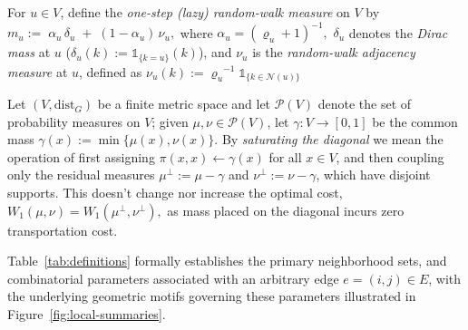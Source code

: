 \documentclass[twoside,11pt]{article}
\numberwithin{equation}{section}
\numberwithin{theorem}{section}
\numberwithin{example}{section}
\begin{document}
\begin{definition}
\label{def:lazy-rw}
For \(u \in V\), define the \emph{one-step (lazy) random-walk measure} on \(V\) by
\(
m_u :=\; \alpha_u\,\delta_u \;+\; (1-\alpha_u)\,\nu_u,
\)
where \(
\alpha_u = (\varrho_u + 1)^{-1},
\)
\(\delta_u\) denotes the \emph{Dirac mass} at \(u\) (\(
  \delta_u(k) := \mathds{1}_{\{k=u\}} (k)
  \)), and  \(\nu_u\) is the \emph{random-walk adjacency measure} at \(u\), defined as
  \(
  \nu_u(k) := {\varrho_u}^{-1}\mathds{1}_{\{k\in\mathcal N(u)\}}
  \)
\end{definition}


\begin{remark}
\label{rem:saturate-diagonal}
Let $(V,\mathrm{dist}_G)$ be a finite metric space and let $\mathcal P(V)$ denote the set of probability measures on $V$; given $\mu,\nu\in\mathcal P(V)$, let $\gamma:V\to[0,1]$ be the common mass
$\gamma(x):=\min\{\mu(x),\nu(x)\}$. By \emph{saturating the diagonal} we mean the operation
of first assigning
\(
\pi(x,x) \leftarrow \gamma(x)
\)
for all $x\in V$,
and then coupling only the residual measures
$\mu^{\perp}:=\mu-\gamma$ and $\nu^{\perp}:=\nu-\gamma$, which have disjoint supports.
This doesn't change nor increase the optimal cost,
\(
W_1(\mu,\nu)=W_1(\mu^{\perp},\nu^{\perp}),
\)
as mass placed on the diagonal incurs zero transportation cost.
\end{remark}

Table~\ref{tab:definitions} formally establishes the primary neighborhood sets, and combinatorial parameters associated with an arbitrary edge \(e=(i,j) \in E\), with the underlying geometric motifs governing these parameters illustrated in Figure~\ref{fig:local-summaries}.
\end{document}
